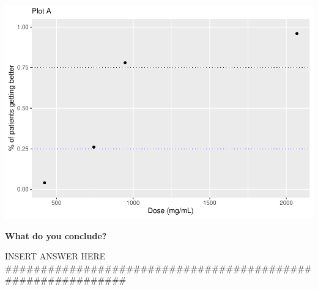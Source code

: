 \documentclass[
]{article}
\begin{document}
\includegraphics{Report_files/figure-latex/unnamed-chunk-40-1.pdf}

\textbf{What do you conclude?}

INSERT ANSWER HERE
\#\#\#\#\#\#\#\#\#\#\#\#\#\#\#\#\#\#\#\#\#\#\#\#\#\#\#\#\#\#\#\#\#\#\#\#\#\#\#\#\#\#\#\#\#\#\#\#\#\#\#\#\#\#\#\#\#\#\#\#
\end{document}
